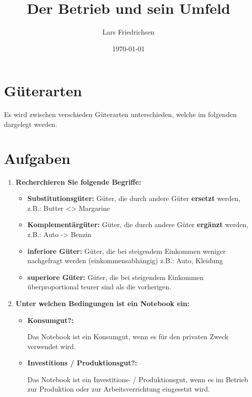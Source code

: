 \documentclass[a4paper,11pt]{scrartcl}	%
\title{Der Betrieb und sein Umfeld}
\author{Lars Friedrichsen}
\date{\today}
\begin{document}
\section{Güterarten}
Es wird zwischen verschieden Güterarten unterschieden, welche im folgenden dargelegt werden.

\section{Aufgaben}

\begin{enumerate}
\item \textbf{Recherchieren Sie folgende Begriffe:}
	
	\begin{itemize}
		\item \textbf{Substitutionsgüter:} Güter, die durch andere Güter \textbf{ersetzt} werden, z.B.: Butter <> Margarine
		\item \textbf{Komplementärgüter:} Güter, die durch andere Güter \textbf{ergänzt} werden, z.B.: Auto -> Benzin 
		\item \textbf{inferiore Güter:} Güter, die bei steigendem Einkommen weniger nachgefragt werden (einkommensabhängig)
		z.B.: Auto, Kleidung
		\item \textbf{superiore Güter:} Güter, die bei steigendem Einkommen überproportional teurer sind als die vorherigen.
	\end{itemize}
	
\item \textbf{Unter welchen Bedingungen ist ein Notebook ein:}
	\begin{itemize}
		\item \textbf{Konsumgut?:}\par
		Das Notebook ist ein Konsumgut, wenn es für den privaten Zweck verwendet wird.
		\item \textbf{Investitions / Produktionsgut?:}\par
		Das Notebook ist ein Investitions- / Produktionsgut, wenn es im Betrieb zur Produktion oder zur Arbeitsverrichtung
		eingesetzt wird.
	\end{itemize}
	

\end{enumerate}
\end{document}
